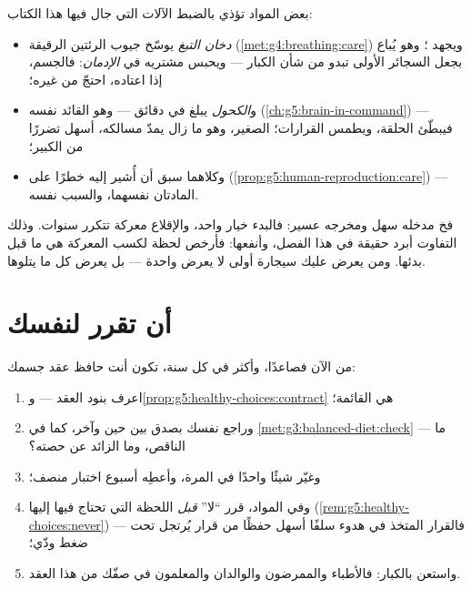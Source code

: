 \begin{proposition}\label{prop:g5:healthy-choices:substances}
بعض المواد تؤذي بالضبط الآلات التي جال فيها هذا الكتاب:
\begin{itemize}
  \item \emph{دخان التبغ} يوسّخ جيوب الرئتين الرقيقة
        (\cref{met:g4:breathing:care}) ويجهد ؛ وهو يُباع
        بجعل السجائر الأولى تبدو من شأن الكبار --- ويحبس
        مشتريه في \emph{الإدمان}: فالجسم، إذا
        اعتاده، احتجّ من غيره؛
  \item و\emph{الكحول} يبلغ  في دقائق --- وهو القائد نفسه
        (\cref{ch:g5:brain-in-command}) --- فيبطّئ الحلقة،
        ويطمس القرارات؛  الصغير، وهو ما زال يمدّ مسالكه،
        أسهل تضررًا من  الكبير؛
  \item وكلاهما سبق أن أُشير إليه خطرًا على 
        (\cref{prop:g5:human-reproduction:care}) --- المادتان
        نفسهما، والسبب نفسه.
\end{itemize}
\end{proposition}
\admitted

\begin{remark}\label{rem:g5:healthy-choices:never}
 فخ مدخله سهل ومخرجه عسير: فالبدء خيار واحد، والإقلاع معركة
تتكرر سنوات. وذلك التفاوت أبرد حقيقة في هذا الفصل، وأنفعها: فأرخص
لحظة لكسب المعركة هي ما قبل بدئها. ومن يعرض عليك سيجارة أولى لا
يعرض واحدة --- بل يعرض كل ما يتلوها.
\end{remark}

\section{أن تقرر لنفسك}

\begin{method}\label{met:g5:healthy-choices:run}
من الآن فصاعدًا، وأكثر في كل سنة، تكون أنت حافظ عقد جسمك:
\begin{enumerate}
  \item اعرف بنود العقد ---
        و\cref{prop:g5:healthy-choices:contract} هي القائمة؛
  \item وراجع نفسك بصدق بين حين وآخر، كما في
        \cref{met:g3:balanced-diet:check} --- ما الناقص، وما
        الزائد عن حصته؟
  \item وغيّر شيئًا واحدًا في المرة، وأعطِه أسبوع اختبار منصف؛
  \item وفي المواد، قرر ``لا'' \emph{قبل} اللحظة التي تحتاج فيها
        إليها (\cref{rem:g5:healthy-choices:never}) --- فالقرار
        المتخذ في هدوء سلفًا أسهل حفظًا من قرار يُرتجل تحت ضغط
        ودّي؛
  \item واستعن بالكبار: فالأطباء والممرضون والوالدان والمعلمون في
        صفّك من هذا العقد.
\end{enumerate}
\end{method}

